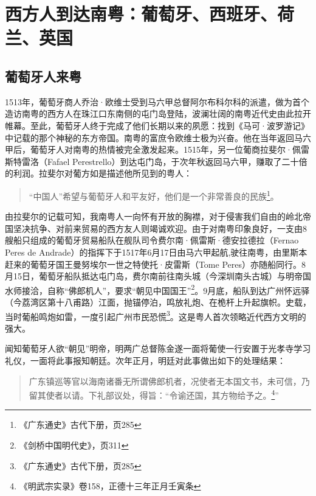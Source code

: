 \chapter{西方人到达南粤：葡萄牙、西班牙、荷兰、英国}

\section{葡萄牙人来粤}

1513年，葡萄牙商人乔治·欧维士受到马六甲总督阿尔布科尔科的派遣，做为首个造访南粤的西方人在珠江口东南侧的屯门岛登陆，波澜壮阔的南粤近代史由此拉开帷幕。至此，葡萄牙人终于完成了他们长期以来的夙愿：找到《马可·波罗游记》中记载的那个神秘的东方帝国。南粤的富庶令欧维士极为兴奋。他在当年返回马六甲后，葡萄牙人对南粤的热情被完全激发起来。1515年，另一位葡商拉斐尔·佩雷斯特雷洛（Fafael Perestrello）到达屯门岛，于次年秋返回马六甲，赚取了二十倍的利润。拉斐尔对葡方如是描述他所见到的粤人：

\begin{quote}

“中国人”希望与葡萄牙人和平友好，他们是一个非常善良的民族\footnote{《广东通史》古代下册，页285}。

\end{quote}

由拉斐尔的记载可知，我南粤人一向怀有开放的胸襟，对于侵害我们自由的岭北帝国坚决抗争、对前来贸易的西方友人则竭诚欢迎。由于对南粤印象良好，一支由8艘船只组成的葡萄牙贸易船队在舰队司令费尔南·佩雷斯·德安拉德拉（Fernao Peres de Andrade）的指挥下于1517年6月17日由马六甲起航,驶往南粤，由里斯本赶来的葡萄牙国王曼努埃尔一世之特使托·皮雷斯（Tome Peres）亦随船同行。8月15日，葡萄牙船队抵达屯门岛，费尔南前往南头城（今深圳南头古城）与明帝国水师接洽，自称“佛郎机人”，要求“朝见中国国王”\footnote{《剑桥中国明代史》，页311}。9月底，船队到达广州怀远驿（今荔湾区第十八甫路）江面，抛锚停泊，鸣放礼炮、在桅杆上升起旗帜。史载，当时葡船鸣炮如雷，一度引起广州市民恐慌\footnote{《广东通史》古代下册，页285}。这是粤人首次领略近代西方文明的强大。

闻知葡萄牙人欲“朝见”明帝，明两广总督陈金遂一面将葡使一行安置于光孝寺学习礼仪，一面将此事报知朝廷。次年正月，明廷对此事做出如下的处理结果：

\begin{quote}

广东镇巡等官以海南诸番无所谓佛郎机者，况使者无本国文书，未可信，乃留其使者以请。下礼部议处，得旨：“令谕还国，其方物给予之。\footnote{《明武宗实录》卷158，正德十三年正月壬寅条}”

\end{quote}

